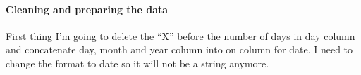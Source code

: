 \documentclass[
]{article}
\newenvironment{Shaded}{\begin{snugshade}}{\end{snugshade}}
\newcommand{\DataTypeTok}[1]{\textcolor[rgb]{0.13,0.29,0.53}{#1}}
\newcommand{\KeywordTok}[1]{\textcolor[rgb]{0.13,0.29,0.53}{\textbf{#1}}}
\newcommand{\NormalTok}[1]{#1}
\newcommand{\StringTok}[1]{\textcolor[rgb]{0.31,0.60,0.02}{#1}}
\begin{document}
\hypertarget{cleaning-and-preparing-the-data}{%
\paragraph{Cleaning and preparing the
data}\label{cleaning-and-preparing-the-data}}

First thing I'm going to delete the ``X'' before the number of days in
day column and concatenate day, month and year column into on column for
date. I need to change the format to date so it will not be a string
anymore.

\begin{Shaded}
\end{Shaded}
\end{document}
